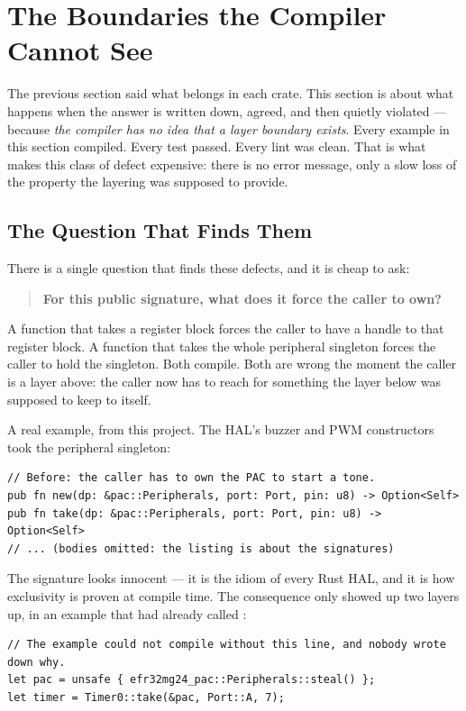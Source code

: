 \section{The Boundaries the Compiler Cannot See}
\label{sec:layer-boundaries}

The previous section said what belongs in each crate. This section is about what happens when the
answer is written down, agreed, and then quietly violated — because \emph{the compiler has no idea
that a layer boundary exists}. Every example in this section compiled. Every test passed. Every
lint was clean. That is what makes this class of defect expensive: there is no error message, only a
slow loss of the property the layering was supposed to provide.

\subsection{The Question That Finds Them}

There is a single question that finds these defects, and it is cheap to ask:

\begin{quote}
    \textbf{For this public signature, what does it force the caller to own?}
\end{quote}

A function that takes a register block forces the caller to have a handle to that register block.
A function that takes the whole peripheral singleton forces the caller to hold the singleton. Both
compile. Both are wrong the moment the caller is a layer above: the caller now has to reach for
something the layer below was supposed to keep to itself.

A real example, from this project. The HAL's buzzer and PWM constructors took the peripheral
singleton:

\begin{verbatim}
// Before: the caller has to own the PAC to start a tone.
pub fn new(dp: &pac::Peripherals, port: Port, pin: u8) -> Option<Self>
pub fn take(dp: &pac::Peripherals, port: Port, pin: u8) -> Option<Self>
// ... (bodies omitted: the listing is about the signatures)
\end{verbatim}

The signature looks innocent — it is the idiom of every Rust HAL, and it is how exclusivity is
proven at compile time. The consequence only showed up two layers up, in an example that had
already called :

\begin{verbatim}
// The example could not compile without this line, and nobody wrote down why.
let pac = unsafe { efr32mg24_pac::Peripherals::steal() };
let timer = Timer0::take(&pac, Port::A, 7);
\end{verbatim}


